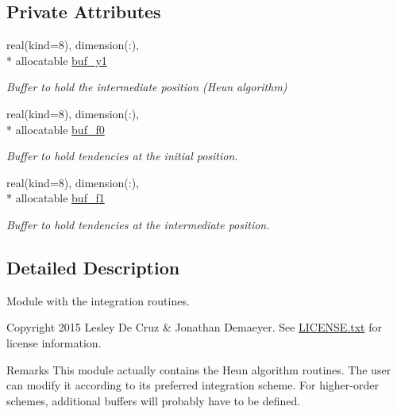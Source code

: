 \subsection*{Private Attributes}
\begin{DoxyCompactItemize}
\item 
real(kind=8), dimension(\-:), \\*
allocatable \hyperlink{classintegrator_ad82fcb5f12f76e9009ccd172f2ffa6b0}{buf\-\_\-y1}
\begin{DoxyCompactList}\small\item\em Buffer to hold the intermediate position (Heun algorithm) \end{DoxyCompactList}\item 
real(kind=8), dimension(\-:), \\*
allocatable \hyperlink{classintegrator_aefe58ac9a698ca7d0440dcaf6103feea}{buf\-\_\-f0}
\begin{DoxyCompactList}\small\item\em Buffer to hold tendencies at the initial position. \end{DoxyCompactList}\item 
real(kind=8), dimension(\-:), \\*
allocatable \hyperlink{classintegrator_acabd8820aca8c50aac234c5d404493b4}{buf\-\_\-f1}
\begin{DoxyCompactList}\small\item\em Buffer to hold tendencies at the intermediate position. \end{DoxyCompactList}\end{DoxyCompactItemize}


\subsection{Detailed Description}
Module with the integration routines. 

\begin{DoxyCopyright}{Copyright}
2015 Lesley De Cruz \& Jonathan Demaeyer. See \hyperlink{LICENSE_8txt}{L\-I\-C\-E\-N\-S\-E.\-txt} for license information. 
\end{DoxyCopyright}
\begin{DoxyRemark}{Remarks}
This module actually contains the Heun algorithm routines. The user can modify it according to its preferred integration scheme. For higher-\/order schemes, additional buffers will probably have to be defined. 
\end{DoxyRemark}


